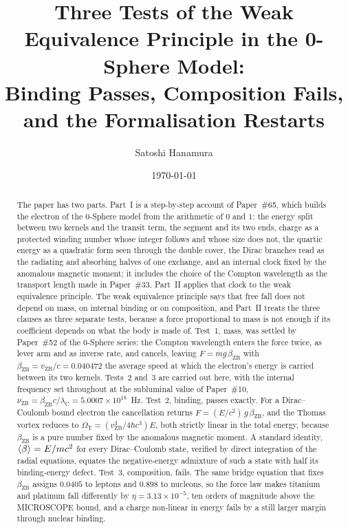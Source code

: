 \documentclass[%
 reprint, amsmath,amssymb, aps, prb, ]{revtex4-2}
\numberwithin{equation}{section}
\newcommand{\vZB}{v_{\text{ZB}}}
\newcommand{\betaZB}{\beta_{\text{ZB}}}
\newcommand{\lambdaC}{\lambda_{\text{C}}}
\newcommand{\nuZB}{\nu_{\text{ZB}}}
\newcommand{\OmT}{\Omega_{\text{T}}}
\begin{document}
\title{Three Tests of the Weak Equivalence Principle in the 0-Sphere Model:\\Binding Passes, Composition Fails,\\and the Formalisation Restarts}

\author{Satoshi Hanamura}
\date{\today}

\begin{abstract}
The paper has two parts.
Part~I is a step-by-step account of Paper~\#65, which builds the electron of the 0-Sphere model from the arithmetic of $0$ and $1$: the energy split between two kernels and the transit term, the segment and its two ends, charge as a protected winding number whose integer follows and whose size does not, the quartic energy as a quadratic form seen through the double cover, the Dirac branches read as the radiating and absorbing halves of one exchange, and an internal clock fixed by the anomalous magnetic moment; it includes the choice of the Compton wavelength as the transport length made in Paper~\#33.
Part~II applies that clock to the weak equivalence principle.
The weak equivalence principle says that free fall does not depend on mass, on internal binding or on composition, and Part~II treats the three clauses as three separate tests, because a force proportional to mass is not enough if its coefficient depends on what the body is made of.
Test~1, mass, was settled by Paper~\#52 of the 0-Sphere series: the Compton wavelength enters the force twice, as lever arm and as inverse rate, and cancels, leaving $F = mg\,\betaZB$ with $\betaZB = \vZB/c = 0.040472$ the average speed at which the electron's energy is carried between its two kernels.
Tests~2 and~3 are carried out here, with the internal frequency set throughout at the subluminal value of Paper~\#10, $\nuZB = \betaZB c/\lambdaC = 5.0007\times10^{18}$~Hz.
Test~2, binding, passes exactly.
For a Dirac--Coulomb bound electron the cancellation returns $F = (E/c^{2})\,g\,\betaZB$, and the Thomas vortex reduces to $\OmT = (\vZB^{3}/4\hbar c^{3})E$, both strictly linear in the total energy, because $\betaZB$ is a pure number fixed by the anomalous magnetic moment.
A standard identity, $\expval{\beta} = E/mc^{2}$ for every Dirac--Coulomb state, verified by direct integration of the radial equations, equates the negative-energy admixture of such a state with half its binding-energy defect.
Test~3, composition, fails.
The same bridge equation that fixes $\betaZB$ assigns $0.0405$ to leptons and $0.898$ to nucleons, so the force law makes titanium and platinum fall differently by $\eta = 3.13\times10^{-5}$, ten orders of magnitude above the MICROSCOPE bound, and a charge non-linear in energy fails by a still larger margin through nuclear binding.

\end{abstract}
\end{document}
